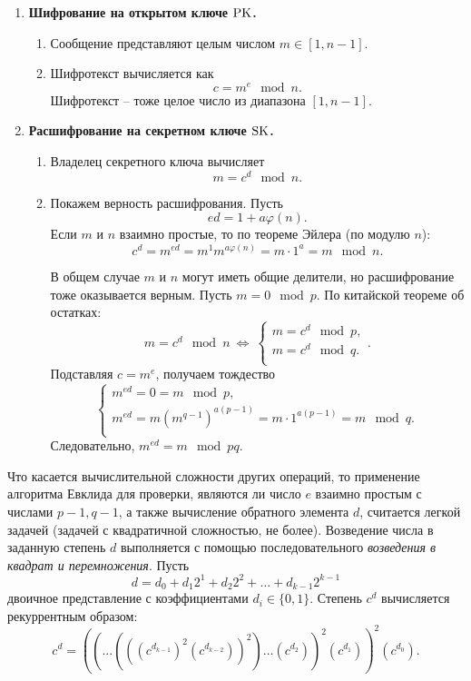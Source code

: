 \begin{enumerate}
    \item \textbf{Шифрование на открытом ключе $\textrm{PK}$.}
        \begin{enumerate}
            \item Сообщение представляют целым числом $m \in [1, n-1]$.
            \item Шифротекст вычисляется как
                \[ c = m^e \mod n. \]
                Шифротекст -- тоже целое число из диапазона $[1, n-1]$.
        \end{enumerate}
    \item \textbf{Расшифрование на секретном ключе $\textrm{SK}$.}
        \begin{enumerate}
            \item Владелец секретного ключа вычисляет
                \[ m = c^d \mod n. \]
            \item Покажем верность расшифрования. Пусть
                \[ ed = 1 + a \varphi(n). \]
                Если $m$ и $n$ взаимно простые, то по теореме Эйлера (по модулю $n$):
                \[ c^d = m ^{ed} = m^1 m^{a\varphi(n)} = m \cdot 1^a = m \mod n. \]

                В общем случае $m$ и $n$ могут иметь общие делители, но расшифрование тоже оказывается верным. Пусть $m = 0 \mod p$. По китайской теореме об остатках:
                \[
                     m = c^d \mod n ~\Leftrightarrow~
                     \left\{ \begin{array}{l}
                        m = c^d \mod p, \\
                        m = c^d \mod q. \\
                     \end{array} \right..
                \]
                Подставляя $c=m^e$, получаем тождество
                \[ \left\{ \begin{array}{l}
                    m^{ed} = 0 = m \mod p, \\
                    m^{ed} = m  \left( m^{q-1} \right)^{a(p-1)} = m \cdot 1^{a(p-1)} = m \mod q. \\
                \end{array} \right. \]
                Следовательно, $m^{ed} = m \mod pq$.
        \end{enumerate}
\end{enumerate}


Что касается вычислительной сложности других операций, то применение алгоритма Евклида для проверки, являются ли число $e$  взаимно простым с числами $p-1, q-1$, а также вычисление обратного элемента $d$, считается легкой задачей (задачей с квадратичной сложностью, не более).
Возведение числа в заданную степень $d$ выполняется с помощью последовательного \emph{возведения в квадрат и перемножения}. Пусть
    \[ d = d_0 + d_1 2^1 + d_2 2^2 + \ldots + d_{k-1} 2^{k-1} \]
двоичное представление с коэффициентами $d_{i} \in \{ 0, 1 \}$. Степень $c^d$ вычисляется рекуррентным образом:
  \[ c^d =((... (((c^ {d_{k-1}})^2  (c^{d_{k-2}}))^2)\dots(c^{d_2}))^2 (c^{d_1}))^2 (c^{d_0}).\]

